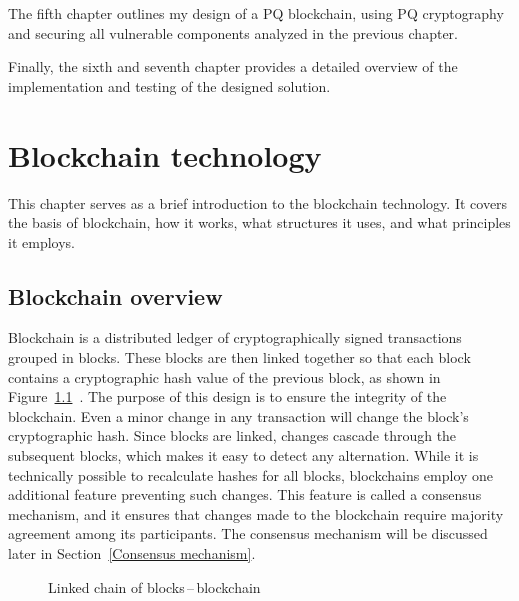 The fifth chapter outlines my design of a PQ blockchain, using PQ cryptography and securing all vulnerable components analyzed in the previous chapter.

Finally, the sixth and seventh chapter provides a detailed overview of the implementation and testing of the designed solution.



\chapter{Blockchain technology}
\label{Blockchain technology}

This chapter serves as a brief introduction to the blockchain technology. It covers the basis of blockchain, how it works, what structures it uses, and what principles it employs.


\section{Blockchain overview}
\label{sec:Blockchain.overview}

Blockchain is a distributed ledger of cryptographically signed transactions grouped in blocks. These blocks are then linked together so that each block contains a cryptographic hash value of the previous block, as shown in Figure~\ref{figure:bc.chainOfBlocks}~\cite{bc.technology.overview}. The purpose of this design is to ensure the integrity of the blockchain. Even a minor change in any transaction will change the block's cryptographic hash. Since blocks are linked, changes cascade through the subsequent blocks, which makes it easy to detect any alternation. While it is technically possible to recalculate hashes for all blocks, blockchains employ one additional feature preventing such changes. This feature is called a consensus mechanism, and it ensures that changes made to the blockchain require majority agreement among its participants. The consensus mechanism will be discussed later in Section~\ref{Consensus mechanism}.

\begin{figure}[ht]
    \begin{center}
    \end{center}
    \caption{Linked chain of blocks\,--\,blockchain}
    \label{figure:bc.chainOfBlocks}
\end{figure}

